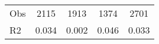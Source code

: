 \begin{tabular}{l*{4}{c}}
\hline                                                                                                                                                                                                                                            
 Obs                   &               2115               &       1913                       &       1374                &              2701                                               \\ 
 R2                    &                      0.034              &              0.002                      &              0.046               &                     0.033                                              \\ 
\hline \end{tabular}                                                                                                                                                                                                              